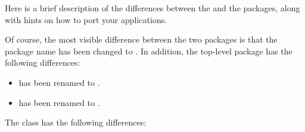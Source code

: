 Here is a brief description of the differences between the
 and the  packages, along with hints on
how to port your applications.

Of course, the most visible difference between the two packages is
that the package name has been changed to .  In
addition, the top-level package has the following differences:

\begin{itemize}
\item {} has been renamed to
      .
\item {} has been renamed to
      .
\end{itemize}

The  class has the following differences:


